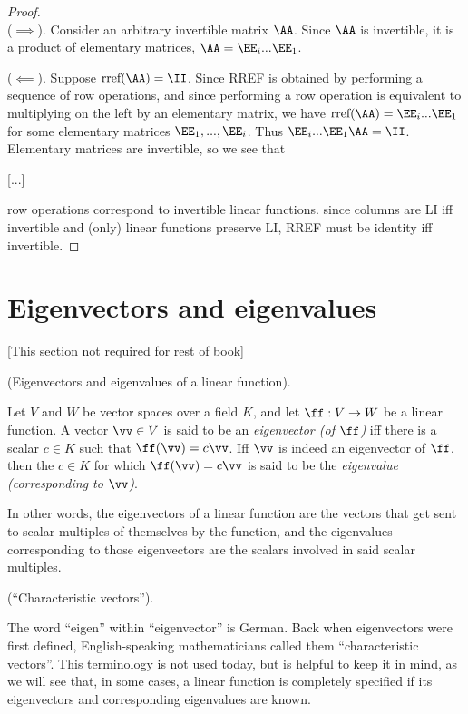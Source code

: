 \begin{proof}
   
   \mbox{} \\ \indent
   ($\implies$). Consider an arbitrary invertible matrix $\AA$. Since $\AA$ is invertible, it is a product of elementary matrices, $\AA = \EE_i ... \EE_1$.

   
   
   
   ($\impliedby$). Suppose $\text{rref}(\AA) = \II$. Since RREF is obtained by performing a sequence of row operations, and since performing a row operation is equivalent to multiplying on the left by an elementary matrix, we have $\text{rref}(\AA) = \EE_i ... \EE_1$ for some elementary matrices $\EE_1, ..., \EE_i$. Thus $\EE_i ... \EE_1 \AA = \II$. Elementary matrices are invertible, so we see that
   
   [...]
   
   row operations correspond to invertible linear functions. since columns are LI iff invertible and (only) linear functions preserve LI, RREF must be identity iff invertible.
\end{proof}

\section{Eigenvectors and eigenvalues}

[This section not required for rest of book]

\begin{defn}
    (Eigenvectors and eigenvalues of a linear function).
    
    Let $V$ and $W$ be vector spaces over a field $K$, and let $\ff:V \rightarrow W$ be a linear function. A vector $\vv \in V$ is said to be an \textit{eigenvector (of $\ff$)} iff there is a scalar $c \in K$ such that $\ff(\vv) = c \vv$. Iff $\vv$ is indeed an eigenvector of $\ff$, then the $c \in K$ for which $\ff(\vv) = c \vv$ is said to be the \textit{eigenvalue (corresponding to $\vv$)}.
    
    In other words, the eigenvectors of a linear function are the vectors that get sent to scalar multiples of themselves by the function, and the eigenvalues corresponding to those eigenvectors are the scalars involved in said scalar multiples.
\end{defn}

\begin{remark}
    (``Characteristic vectors'').
    
    The word ``eigen'' within ``eigenvector'' is German. Back when eigenvectors were first defined, English-speaking mathematicians called them ``characteristic vectors''. This terminology is not used today, but is helpful to keep it in mind, as we will see that, in some cases, a linear function is completely specified if its eigenvectors and corresponding eigenvalues are known.
\end{remark}

